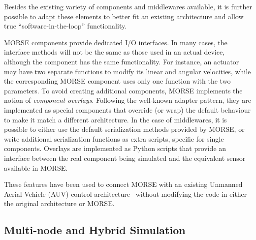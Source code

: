 \documentclass{llncs}
\begin{document}
Besides the existing variety of components and middlewares available, it is
further possible to adapt these elements to better fit an existing
architecture and allow true ``software-in-the-loop'' functionality.

MORSE components provide dedicated I/O interfaces. In
many cases, the interface methods will not be the same as those used in an
actual device, although the component has the same functionality.
For instance, an actuator may have two separate functions to modify its linear
and angular velocities, while the corresponding MORSE component uses only one
function with the two parameters. To avoid creating additional components,
MORSE implements the notion of \emph{component overlays}. Following
the well-known adapter pattern, they are implemented as
special components that override (or wrap) the default
behaviour to make it match a different architecture.
In the case of middlewares, it is possible to either use the default
serialization methods provided by MORSE, or write additional serialization
functions as extra scripts, specific for single components.
Overlays are implemented as Python scripts that provide an interface between
the real component being simulated and the equivalent sensor available in
MORSE.

These features have been used to connect MORSE with an existing
Unmanned Aerial Vehicle (AUV) control architecture~\cite{barbier2011}
without modifying the code in either the original architecture or MORSE.


\subsection{Multi-node and Hybrid Simulation}
\label{section:multinode}
\end{document}
